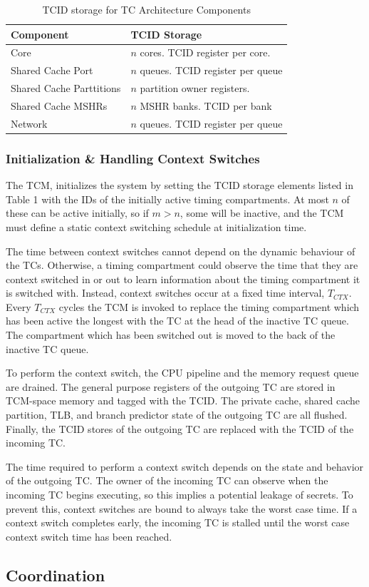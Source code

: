 \begin{table}
\begin{tabular}{l|l}
    \hline
    Component & TCID Storage \\
    \hline
    Core & $n$ cores. TCID register per core. \\
    Shared Cache Port & $n$ queues. TCID register per queue \\
    Shared Cache Parttitions & $n$ partition owner registers. \\
    Shared Cache MSHRs & $n$ MSHR banks. TCID per bank \\
    Network & $n$ queues. TCID register per queue\\
    \hline
\end{tabular}
    \caption{TCID storage for TC Architecture Components}
    \label{table:tcid}
\end{table}

\subsubsection{Initialization \& Handling Context Switches}
The TCM, initializes the system by setting the TCID storage elements listed in 
Table 1 with the IDs of the initially active timing compartments. At most $n$ 
of these can be active initially, so if $m>n$, some will be inactive, and the 
TCM must define a static context switching schedule at initialization time.

The time between context switches cannot depend on the dynamic behaviour of the 
TCs. Otherwise, a timing compartment could observe the time that they are 
context switched in or out to learn information about the timing compartment it 
is switched with. Instead, context switches occur at a fixed time interval, 
$T_{CTX}$. Every $T_{CTX}$ cycles the TCM is invoked to replace the timing 
compartment which has been active the longest with the TC at the head of the 
inactive TC queue. The compartment which has been switched out is moved to the 
back of the inactive TC queue.

To perform the context switch, the CPU pipeline and the memory request queue 
are drained. The general purpose registers of the outgoing TC are stored in 
TCM-space memory and tagged with the TCID. The private cache, shared cache 
partition, TLB, and branch predictor state of the outgoing TC are all flushed.  
Finally, the TCID stores of the outgoing TC are replaced with the TCID of the 
incoming TC. 

The time required to perform a context switch depends on the state and behavior 
of the outgoing TC. The owner of the incoming TC can observe when the incoming 
TC begins executing, so this implies a potential leakage of secrets.  To 
prevent this, context switches are bound to always take the worst case time.  
If a context switch completes early, the incoming TC is stalled until the worst 
case context switch time has been reached.

\subsection{Coordination}
